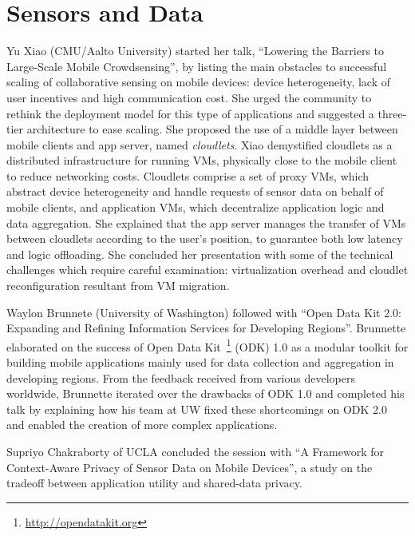 \section{Sensors and Data}
\label{sec:sensors}


Yu Xiao (CMU\slash Aalto University) started her talk, ``Lowering the Barriers
to Large-Scale Mobile Crowdsensing'', by listing the main obstacles to
successful scaling of collaborative sensing on mobile devices: device
heterogeneity, lack of user incentives and high communication cost. She
urged the community to rethink the deployment model for this type of
applications and suggested a three-tier architecture to ease scaling.
She proposed the use of a middle layer between mobile clients and app
server, named \emph{cloudlets}. Xiao demystified cloudlets as a
distributed infrastructure for running VMs, physically close to the
mobile client to reduce networking costs. Cloudlets comprise a set of
proxy VMs, which abstract device heterogeneity and handle requests of
sensor data on behalf of mobile clients, and application VMs, which
decentralize application logic and data aggregation. She explained that
the app server manages the transfer of VMs between cloudlets according
to the user's position, to guarantee both low latency and logic
offloading. She concluded her presentation with some of the technical
challenges which require careful examination: virtualization overhead
and cloudlet reconfiguration resultant from VM migration.

Waylon Brunnete (University of Washington) followed with ``Open Data Kit
2.0: Expanding and Refining Information Services for Developing
Regions''. Brunnette elaborated on the success of Open Data
Kit~\footnote{\url{http://opendatakit.org}} (ODK) 1.0 as a modular
toolkit for building mobile applications mainly used for data collection
and aggregation in developing regions. From the feedback received from
various developers worldwide, Brunnette iterated over the drawbacks of
ODK 1.0 and completed his talk by explaining how his team at UW fixed
these shortcomings on ODK 2.0 and enabled the creation of more complex
applications.


Supriyo Chakraborty of UCLA concluded the session with ``A
Framework for Context-Aware Privacy of Sensor Data on Mobile Devices'',
a study on the tradeoff between application utility and shared-data
privacy.

